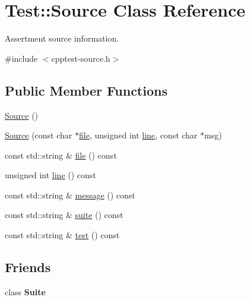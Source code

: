 \hypertarget{class_test_1_1_source}{}\section{Test\+:\+:Source Class Reference}
\label{class_test_1_1_source}


Assertment source information.  




{\ttfamily \#include $<$cpptest-\/source.\+h$>$}

\subsection*{Public Member Functions}
\begin{DoxyCompactItemize}
\item 
\hyperlink{class_test_1_1_source_abe0f303fe92270aa12a4a749ae0395ef}{Source} ()
\item 
\hyperlink{class_test_1_1_source_ac764beb685a574b81527d0f90ae9e428}{Source} (const char $\ast$\hyperlink{class_test_1_1_source_abb9d618ed57da70f177289b4bb035f02}{file}, unsigned int \hyperlink{class_test_1_1_source_aa61df0b07337fb411d67222669a8bc16}{line}, const char $\ast$msg)
\item 
const std\+::string \& \hyperlink{class_test_1_1_source_abb9d618ed57da70f177289b4bb035f02}{file} () const 
\item 
unsigned int \hyperlink{class_test_1_1_source_aa61df0b07337fb411d67222669a8bc16}{line} () const 
\item 
const std\+::string \& \hyperlink{class_test_1_1_source_adc700711d70f29ead5f5608dd6327ef2}{message} () const 
\item 
const std\+::string \& \hyperlink{class_test_1_1_source_a16e0a118d2d7af145a6169ff2b342290}{suite} () const 
\item 
const std\+::string \& \hyperlink{class_test_1_1_source_ab92c88c2842efb33daf97fe601a3653b}{test} () const 
\end{DoxyCompactItemize}
\subsection*{Friends}
\begin{DoxyCompactItemize}
\item 
class {\bfseries Suite}\hypertarget{class_test_1_1_source_a7de7b0dd89982bdae285f3a3b6197f9c}{}\label{class_test_1_1_source_a7de7b0dd89982bdae285f3a3b6197f9c}

\end{DoxyCompactItemize}


